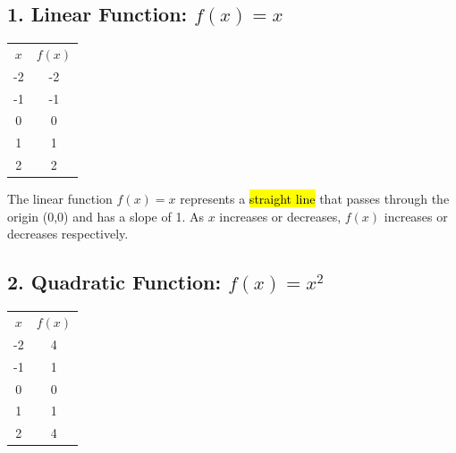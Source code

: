 \documentclass[12pt,a4paper]{article}
\begin{document}
\subsection*{1. Linear Function: $f(x) = x$}
\begin{minipage}{0.5\textwidth}
\end{minipage}
\hspace{1cm}
\begin{minipage}{0.4\textwidth}
\centering
\begin{tabular}{cc}

$x$ & $f(x)$ \\
-2 & -2 \\
-1 & -1 \\
0 & 0 \\
1 & 1 \\
2 & 2 \\

\end{tabular}
\end{minipage}

The linear function $f(x) = x$ represents a \hl{straight line} that passes through the origin (0,0) and has a slope of 1. As $x$ increases or decreases, $f(x)$ increases or decreases respectively.

\subsection*{2. Quadratic Function: $f(x) = x^2$}
\begin{minipage}{0.5\textwidth}
\end{minipage}
\hspace{1cm}
\begin{minipage}{0.4\textwidth}
\centering
\begin{tabular}{cc}
\toprule
$x$ & $f(x)$ \\

-2 & 4 \\
-1 & 1 \\
0 & 0 \\
1 & 1 \\
2 & 4 \\

\end{tabular}
\end{minipage}
\end{document}
